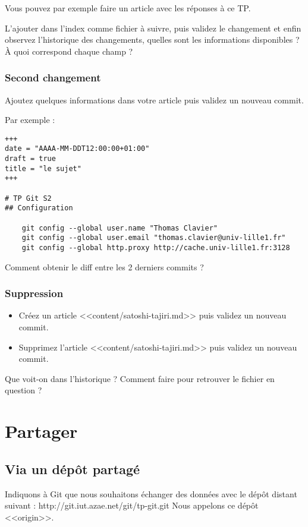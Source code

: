 \documentclass[a4paper]{article}
\newcounter{question}
\begin{document}
Vous pouvez par exemple faire un article avec les réponses à ce TP.

L'ajouter dans l'index comme fichier à suivre, puis validez le changement et enfin observez l'historique des changements, quelles sont les informations disponibles ? À quoi correspond chaque champ ?

\subsubsection{Second changement}
Ajoutez quelques informations dans votre article puis validez un nouveau commit.

Par exemple : 
\begin{verbatim}
+++
date = "AAAA-MM-DDT12:00:00+01:00"
draft = true
title = "le sujet"
+++

# TP Git S2
## Configuration

    git config --global user.name "Thomas Clavier"
    git config --global user.email "thomas.clavier@univ-lille1.fr"
    git config --global http.proxy http://cache.univ-lille1.fr:3128

\end{verbatim}

Comment obtenir le diff entre les 2 derniers commits ?

\subsubsection{Suppression}
\begin{itemize}
\item Créez un article <<content/satoshi-tajiri.md>> puis validez un nouveau commit. 
\item Supprimez l'article <<content/satoshi-tajiri.md>> puis validez un nouveau commit. 
\end{itemize}

Que voit-on dans l'historique ?
Comment faire pour retrouver le fichier en question ?

\section{Partager}

\subsection{Via un dépôt partagé}

Indiquons à Git que nous souhaitons échanger des données avec le dépôt distant suivant : http://git.iut.azae.net/git/tp-git.git
Nous appelons ce dépôt <<origin>>.
\end{document}
